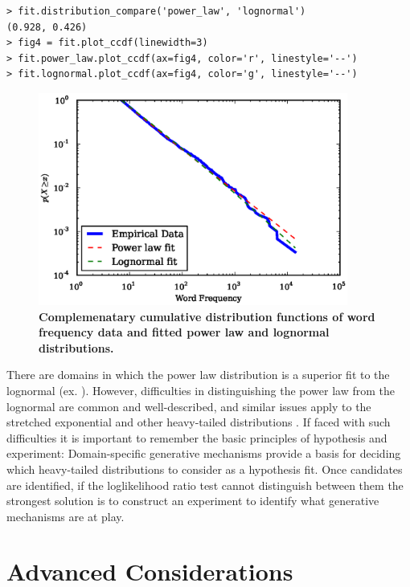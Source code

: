 \documentclass[10pt]{article}
\begin{document}
\begin{verbatim}
> fit.distribution_compare('power_law', 'lognormal')
(0.928, 0.426)
> fig4 = fit.plot_ccdf(linewidth=3)
> fit.power_law.plot_ccdf(ax=fig4, color='r', linestyle='--')
> fit.lognormal.plot_ccdf(ax=fig4, color='g', linestyle='--')
\end{verbatim}

\begin{figure}[!ht]
\begin{center}
\includegraphics[width=4in]{FigLognormal.eps}
\end{center}
\caption{
{\bf Complemenatary cumulative distribution functions of word frequency data and fitted power law and lognormal distributions.}
}
\label{Lognormal}
\end{figure}

There are domains in which the power law distribution is a superior fit to the lognormal (ex. \cite{Klaus2011}). However, difficulties in distinguishing the power law from the lognormal are common and well-described, and similar issues apply to the stretched exponential and other heavy-tailed distributions \cite{Malevergne2009, Malevergne2005,Mitzenmacher2004}. If faced with such difficulties it is important to remember the basic principles of hypothesis and experiment: Domain-specific generative mechanisms provide a basis for deciding which heavy-tailed distributions to consider as a hypothesis fit. Once candidates are identified, if the loglikelihood ratio test cannot distinguish between them the strongest solution is to construct an experiment to identify what generative mechanisms are at play. 

\section*{Advanced Considerations}
\end{document}
